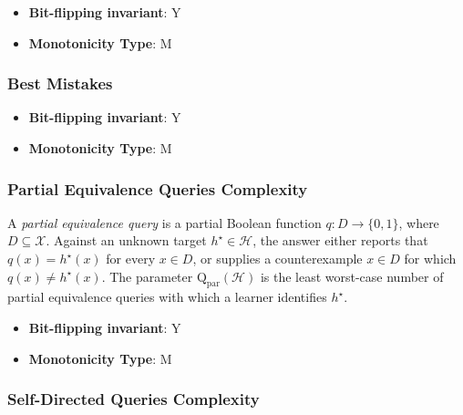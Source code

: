       \begin{definition}\label{def:worst_mistakes}
      
      \end{definition}
      \begin{itemize}
      \item {\bf Bit-flipping invariant}: Y
      \item {\bf Monotonicity Type}: M
      \end{itemize}
\subsubsection{Best Mistakes}
      
      \begin{definition}\label{def:best_mistakes}
      
      \end{definition}
      \begin{itemize}
      \item {\bf Bit-flipping invariant}: Y
      \item {\bf Monotonicity Type}: M
      \end{itemize}
\subsubsection{Partial Equivalence Queries Complexity}
      
      \begin{definition}\label{def:partial_equivalence_queries_complexity}
      A \emph{partial equivalence query} is a partial Boolean function $q:D\to\{0,1\}$, where $D\subseteq\mathcal X$.  Against an unknown target $h^\star\in\mathcal H$, the answer either reports that $q(x)=h^\star(x)$ for every $x\in D$, or supplies a counterexample $x\in D$ for which $q(x)\ne h^\star(x)$.  The parameter $\mathrm Q_{\mathrm{par}}(\mathcal H)$ is the least worst-case number of partial equivalence queries with which a learner identifies $h^\star$.
      \end{definition}
      \begin{itemize}
      \item {\bf Bit-flipping invariant}: Y
      \item {\bf Monotonicity Type}: M
      \end{itemize}
\subsubsection{Self-Directed Queries Complexity}
      
